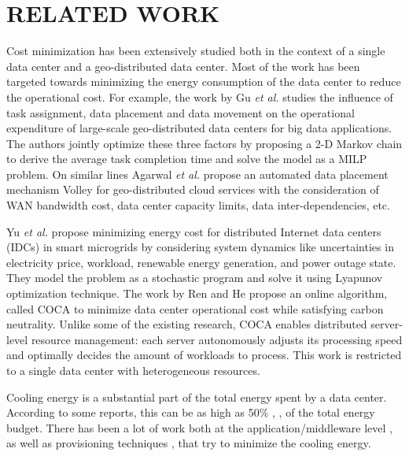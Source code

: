 \documentclass[conference,12pt]{IEEEtran}
\begin{document}
   


\section{RELATED WORK}
\label{sec:related} 
Cost minimization has been extensively studied both in the context of a single data center and a geo-distributed data center. Most of the work has been targeted towards minimizing the energy consumption of the data center to reduce the operational cost. For example, the work by Gu \textit{et al.} \cite{gu2014cost} studies the influence of task assignment, data placement  and data movement on the operational expenditure of large-scale geo-distributed data centers for big data applications. The authors jointly optimize  these three factors by proposing a 2-D Markov chain to derive the average task completion time and solve the model as a MILP problem. On similar lines Agarwal \textit{et al.} \cite{agarwal2010volley} propose an automated data placement mechanism Volley for geo-distributed cloud services with the consideration of WAN bandwidth cost, data center capacity limits, data inter-dependencies, etc. 

Yu \textit{et al.}\cite{yu2015energy} propose minimizing energy cost for distributed Internet data centers (IDCs) in smart microgrids by considering system dynamics like uncertainties in electricity price, workload, renewable energy generation, and power outage state. They model the problem as a stochastic program and solve it using Lyapunov optimization technique. The work by Ren and He  \cite{ren2013coca} propose an online algorithm, called COCA to minimize data center operational cost while satisfying carbon neutrality. Unlike some of the existing research, COCA enables distributed server-level resource management: each server autonomously adjusts its processing speed and optimally decides the amount of workloads to process. This work is restricted to a single data center with heterogeneous resources. 

Cooling energy is a substantial part of the total energy spent by a data center. According to some reports, this can be as high as 50\% \cite{sullivan2002alternating}, \cite{patel2003smart},\cite{sawyer2004calculating} of the total energy budget. There has been a lot of work both at the application/middleware level \cite{TempLDBSC11}, \cite{leverich2010energy} as well as provisioning techniques  \cite{tang2007thermal}, \cite{chen2010integrated} that try to minimize the cooling energy.   
\end{document}

